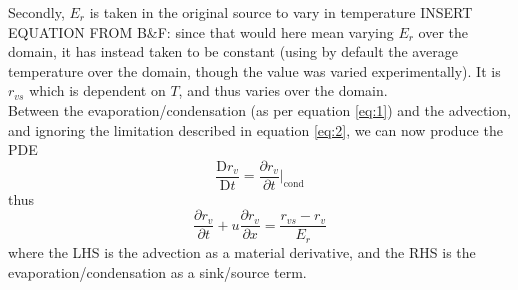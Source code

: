 \documentclass[11pt]{article}
\begin{document}
Secondly, $E_r$ is taken in the original source to vary in temperature INSERT EQUATION FROM B\&F: since that would here mean varying $E_r$ over the domain, it has instead taken to be constant (using by default the average temperature over the domain, though the value was varied experimentally). It is $r_{vs}$ which is dependent on $T$, and thus varies over the domain. \\
Between the evaporation/condensation (as per equation \ref{eq:1}) and the advection, and ignoring the limitation described in equation \ref{eq:2}, we can now produce the PDE
\[
\frac{\text{D} r_v}{\text{D} t}=\frac{\partial r_v}{\partial t}|_{\text{cond}}
\]
thus
\begin{equation}
\frac{\partial r_v}{\partial t}+u\frac{\partial r_v}{\partial x}=\frac{r_{vs} - r_v}{E_r} \label{eq:3}
\end{equation}
where the LHS is the advection as a material derivative, and the RHS is the evaporation/condensation as a sink/source term.
\end{document}

